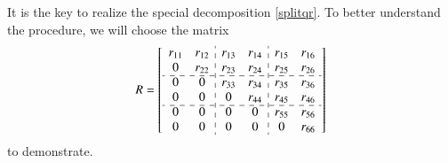\documentclass[5p]{elsarticle}
\numberwithin{equation}{section}
\begin{document}
 It is the key to realize the special decomposition \eqref{splitqr}. To better understand the procedure, we will choose the matrix 
\[R= \begin{bmatrix}
\begin{array}{cc:cc:cc}
 r_{11} & r_{12} & r_{13} & r_{14} & r_{15} & r_{16}\\
 0 & r_{22} & r_{23} & r_{24} & r_{25} & r_{26}\\
 \cdashline{1-6}
 0      & 0      & r_{33} & r_{34} & r_{35} & r_{36}\\
 0      & 0      & 0 & r_{44} & r_{45} & r_{46}\\
 \cdashline{1-6}
 0      & 0      & 0      & 0      & r_{55} & r_{56}\\
 0      & 0      & 0      & 0      & 0 & r_{66}\\
\end{array}
\end{bmatrix}
\]
to demonstrate. 
\end{document}
